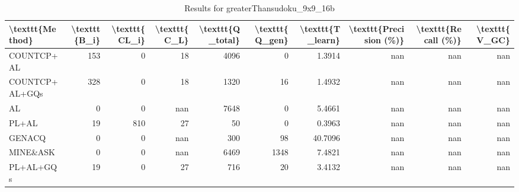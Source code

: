 \begin{table}[ht]
\caption{Results for greaterThansudoku_9x9_16b}
\begin{tabular}{lrrrrrrrrr}
\hline
 \textbackslash{}texttt\{Method\}   &   \textbackslash{}texttt\{B\_i\} &   \textbackslash{}texttt\{CL\_i\} &   \textbackslash{}texttt\{C\_L\} &   \textbackslash{}texttt\{Q\_total\} &   \textbackslash{}texttt\{Q\_gen\} &   \textbackslash{}texttt\{T\_learn\} &   \textbackslash{}texttt\{Precision (\%)\} &   \textbackslash{}texttt\{Recall (\%)\} &   \textbackslash{}texttt\{V\_GC\} \\
\hline
 COUNTCP+AL        &            153 &               0 &             18 &               4096 &                0 &             1.3914 &                      nan &                   nan &             nan \\
 COUNTCP+AL+GQs    &            328 &               0 &             18 &               1320 &               16 &             1.4932 &                      nan &                   nan &             nan \\
 AL                &              0 &               0 &            nan &               7648 &                0 &             5.4661 &                      nan &                   nan &             nan \\
 PL+AL             &             19 &             810 &             27 &                 50 &                0 &             0.3963 &                      nan &                   nan &             nan \\
 GENACQ            &              0 &               0 &            nan &                300 &               98 &            40.7096 &                      nan &                   nan &             nan \\
 MINE\&ASK          &              0 &               0 &            nan &               6469 &             1348 &             7.4821 &                      nan &                   nan &             nan \\
 PL+AL+GQs         &             19 &               0 &             27 &                716 &               20 &             3.4132 &                      nan &                   nan &             nan \\
\hline
\end{tabular}
\end{table}